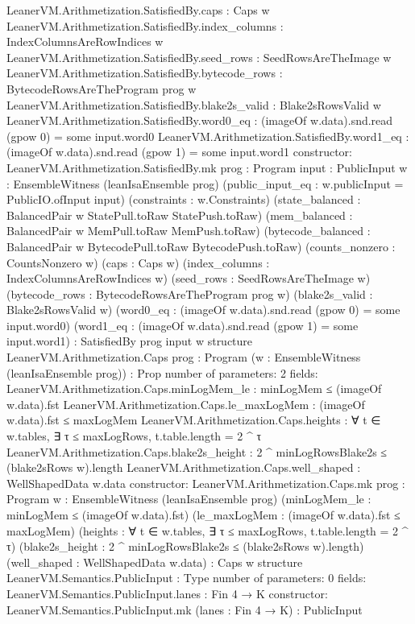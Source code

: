 \begin{srccode}[numbers=left,numbersep=3pt]
  LeanerVM.Arithmetization.SatisfiedBy.caps : Caps w
  LeanerVM.Arithmetization.SatisfiedBy.index_columns : IndexColumnsAreRowIndices w
  LeanerVM.Arithmetization.SatisfiedBy.seed_rows : SeedRowsAreTheImage w
  LeanerVM.Arithmetization.SatisfiedBy.bytecode_rows : BytecodeRowsAreTheProgram prog w
  LeanerVM.Arithmetization.SatisfiedBy.blake2s_valid : Blake2sRowsValid w
  LeanerVM.Arithmetization.SatisfiedBy.word0_eq : (imageOf w.data).snd.read (gpow 0) = some input.word0
  LeanerVM.Arithmetization.SatisfiedBy.word1_eq : (imageOf w.data).snd.read (gpow 1) = some input.word1
constructor:
  LeanerVM.Arithmetization.SatisfiedBy.mk {prog : Program} {input : PublicInput}
    {w : EnsembleWitness (leanIsaEnsemble prog)} (public_input_eq : w.publicInput = PublicIO.ofInput input)
    (constraints : w.Constraints) (state_balanced : BalancedPair w StatePull.toRaw StatePush.toRaw)
    (mem_balanced : BalancedPair w MemPull.toRaw MemPush.toRaw)
    (bytecode_balanced : BalancedPair w BytecodePull.toRaw BytecodePush.toRaw) (counts_nonzero : CountsNonzero w)
    (caps : Caps w) (index_columns : IndexColumnsAreRowIndices w) (seed_rows : SeedRowsAreTheImage w)
    (bytecode_rows : BytecodeRowsAreTheProgram prog w) (blake2s_valid : Blake2sRowsValid w)
    (word0_eq : (imageOf w.data).snd.read (gpow 0) = some input.word0)
    (word1_eq : (imageOf w.data).snd.read (gpow 1) = some input.word1) : SatisfiedBy prog input w
structure LeanerVM.Arithmetization.Caps {prog : Program} (w : EnsembleWitness (leanIsaEnsemble prog)) : Prop
number of parameters: 2
fields:
  LeanerVM.Arithmetization.Caps.minLogMem_le : minLogMem ≤ (imageOf w.data).fst
  LeanerVM.Arithmetization.Caps.le_maxLogMem : (imageOf w.data).fst ≤ maxLogMem
  LeanerVM.Arithmetization.Caps.heights : ∀ t ∈ w.tables, ∃ τ ≤ maxLogRows, t.table.length = 2 ^ τ
  LeanerVM.Arithmetization.Caps.blake2s_height : 2 ^ minLogRowsBlake2s ≤ (blake2sRows w).length
  LeanerVM.Arithmetization.Caps.well_shaped : WellShapedData w.data
constructor:
  LeanerVM.Arithmetization.Caps.mk {prog : Program} {w : EnsembleWitness (leanIsaEnsemble prog)}
    (minLogMem_le : minLogMem ≤ (imageOf w.data).fst) (le_maxLogMem : (imageOf w.data).fst ≤ maxLogMem)
    (heights : ∀ t ∈ w.tables, ∃ τ ≤ maxLogRows, t.table.length = 2 ^ τ)
    (blake2s_height : 2 ^ minLogRowsBlake2s ≤ (blake2sRows w).length) (well_shaped : WellShapedData w.data) : Caps w
structure LeanerVM.Semantics.PublicInput : Type
number of parameters: 0
fields:
  LeanerVM.Semantics.PublicInput.lanes : Fin 4 → K
constructor:
  LeanerVM.Semantics.PublicInput.mk (lanes : Fin 4 → K) : PublicInput

\end{srccode}
